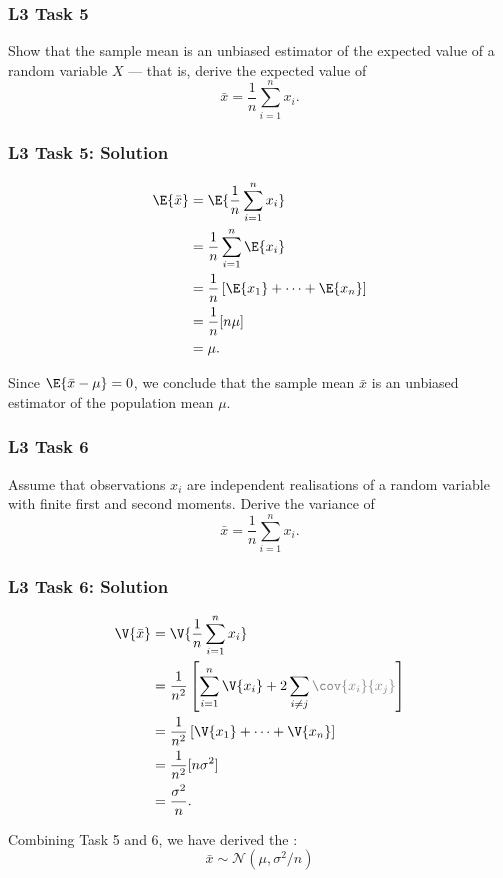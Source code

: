 \documentclass[compress]{beamer}\usepackage[]{graphicx}\usepackage[]{xcolor}
\begin{document}
\begin{frame}[fragile]
  \frametitle{L3 Task 5}
    Show that the sample mean is an unbiased estimator of the expected value of a random variable $X$ --- that is,  derive the expected value of
    \[ \bar{x} = \frac{1}{n} \sum_{i=1}^n x_i. \]
\end{frame}


\begin{frame}[fragile]
  \frametitle{L3 Task 5: Solution}
    \begin{equation*}
      \begin{aligned}
        \E{\bar{x}} &= \E{\frac{1}{n} \sum_{i=1}^n x_i} \\
          &= \frac{1}{n} \sum_{i=1}^n \E{x_i} \\
          &= \frac{1}{n} \left[ \E{x_1} + \cdots + \E{x_n}  \right] \\
          &= \frac{1}{n} [n \mu] \\
          &= \mu.
      \end{aligned}
    \end{equation*}

    Since $\E{\bar{x} - \mu} = 0$, we conclude that the sample mean $\bar{x}$ is an unbiased estimator of the population mean $\mu$.
\end{frame}


\begin{frame}[fragile]
  \frametitle{L3 Task 6}
    Assume that observations $x_i$ are independent realisations of a random variable with finite first and second moments. Derive the variance of
      \[ \bar{x} = \frac{1}{n} \sum_{i=1}^n x_i. \]
\end{frame}


\begin{frame}[fragile]
  \frametitle{L3 Task 6: Solution}
    \begin{equation*}
      \begin{aligned}
        \V{\bar{x}} &= \V{\frac{1}{n} \sum_{i=1}^n x_i} \\
          &= \frac{1}{n^2} \left[ \sum_{i=1}^n \V{x_i} + 2\sum_{i \neq j} \color{gray}{\cov{x_i}{x_j}}\color{black} \right]\\
          &= \frac{1}{n^2} \left[ \V{x_1} + \cdots + \V{x_n}  \right] \\
          &= \frac{1}{n^2} [n \sigma^2] \\
          &= \frac{\sigma^2}{n}.
      \end{aligned}
    \end{equation*}

    Combining Task 5 and 6, we have derived the :
    \[ \bar{x} \sim \mathcal{N} \left( \mu, \sigma^2 / n \right) \]
\end{frame}
\end{document}
